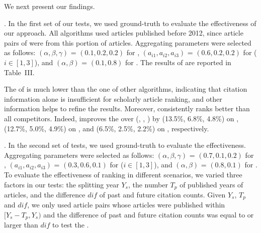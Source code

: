 We next present our findings.

.
In the first set of our tests, we used ground-truth \recom to evaluate the effectiveness of our approach.
All algorithms used articles published before 2012, since article pairs of \recom were from this portion of articles.
Aggregating parameters were selected as follows: $(\alpha,\beta,\gamma)$ = $(0.1, 0.2, 0.2)$ for \futurerank, $(a_{i1},a_{i2},a_{i3})$ = $(0.6, 0.2, 0.2)$ for \hhgrank ($i\in[1,3]$), and $(\alpha,\beta)$ = $(0.1, 0.8)$ for \ensemblerank.
The results of \PairAcc are reported in Table~III.

The \PairAcc of \pagerank is much lower than the one of other algorithms, indicating that citation information alone is insufficient for scholarly article ranking, and other information helps to refine the results. Moreover, \ensemblerank consistently ranks better than all competitors. Indeed, \ensemblerank improves the \PairAcc over (\pagerank, \futurerank, \hhgrank) by (13.5\%, 6.8\%, 4.8\%) on \aan, (12.7\%, 5.0\%, 4.9\%) on \aminer, and (6.5\%, 2.5\%, 2.2\%) on \magdata, respectively.

.
In the second set of tests, we used ground-truth \fcita to evaluate the effectiveness.
Aggregating parameters were selected as follows: $(\alpha, \beta, \gamma)$ = $(0.7, 0.1, 0.2)$ for \futurerank, $(a_{i1}, a_{i2}, a_{i3})$ = $(0.3, 0.6, 0.1)$ for \hhgrank ($i\in[1, 3]$), and $(\alpha, \beta)$ = $(0.8, 0.1)$ for \ensemblerank.
To evaluate the effectiveness of ranking in different scenarios, we varied three factors in our tests: the splitting year $Y_s$, the number $T_p$ of published years of articles, and the difference $dif$ of past and future citation counts.
%
Given $Y_s$, $T_p$ and $dif$, we only used article pairs whose articles were published within $[Y_s - T_p, Y_s)$ and the difference of past and future citation counts was equal to or larger than $dif$ to test the \PairAcc.



